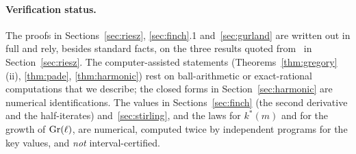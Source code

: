 \paragraph{Verification status.} The proofs in Sections~\ref{sec:riesz}, \ref{sec:finch}.1 and~\ref{sec:gurland} are written out in full and rely, besides standard facts, on the three results quoted from~\cite{Fan} in Section~\ref{sec:riesz}. The computer-assisted statements (Theorems~\ref{thm:gregory}(ii), \ref{thm:pade}, \ref{thm:harmonic}) rest on ball-arithmetic or exact-rational computations that we describe; the closed forms in Section~\ref{sec:harmonic} are numerical identifications. The values in Sections~\ref{sec:finch} (the second derivative and the half-iterates) and~\ref{sec:stirling}, and the laws for $k^*(m)$ and for the growth of $\mathrm{Gr}(\ell)$, are numerical, computed twice by independent programs for the key values, and \emph{not} interval-certified.
